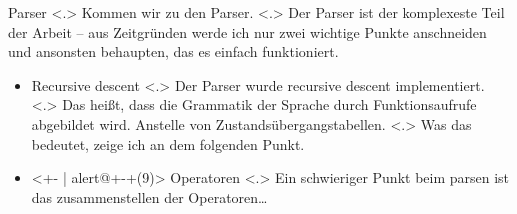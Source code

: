   \begin{frame}{Parser}
    \vspace*{1em}%
    \pause
        \note[item]<.>{
          Kommen wir zu den Parser.
        }
        \note[item]<.>{
          Der Parser ist der komplexeste Teil der Arbeit -- aus Zeitgründen werde ich nur zwei wichtige Punkte anschneiden und ansonsten behaupten, das es einfach funktioniert.
        }
    \begin{itemize}[<+- | alert@+>]
      \item
        Recursive descent
            \note[item]<.>{
              Der Parser wurde recursive descent implementiert.
            }
            \note[item]<.>{
              Das heißt, dass die Grammatik der Sprache durch Funktionsaufrufe abgebildet wird. Anstelle von Zustandsübergangstabellen.
            }
            \note[item]<.>{
              Was das bedeutet, zeige ich an dem folgenden Punkt.
            }
      \item<+- | alert@+-+(9)>
        Operatoren
            \note[item]<.>{
              Ein schwieriger Punkt beim parsen ist das zusammenstellen der Operatoren\ldots
            }


\end{itemize}
\end{frame}
